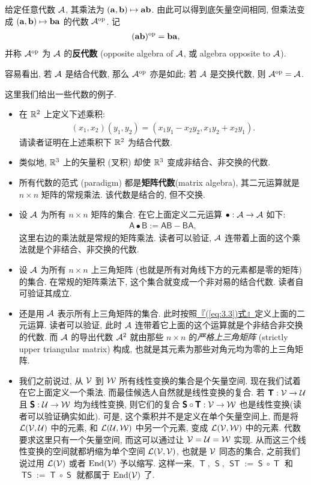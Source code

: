 \documentclass[lang=cn,zihao=-4,twoside,fontset=none]{textbook}
\makeatletter
\DeclareMathOperator{\End}{End}
\newcommand{\bsf}[1]{{\mathop{\pmb{\mathsf{#1}}}}}
\def\EQ#1{\begin{equation}\begin{aligned}{}#1\end{aligned}\end{equation}}
\def\eq#1{\[\begin{aligned}{}#1\end{aligned}\]}
\newcommand{\opp}{{\mathrm{op}}}
\renewcommand{\eqref}[1]{\hyperref[#1]{『\textnormal{(\ref*{#1})}式』}}
\newcommand{\addterm}[2]{\textbf{#1}{(#2)}\index[nidx]{#1@\textbf{#1}(#2)}}
\makeatother
\begin{document}
\begin{defi}
    [反代数]\label{def:3.1.8}%
    给定任意代数 ${\mathcal A}$, 其乘法为 $({\mathbf a},{\mathbf b})\mapsto{\mathbf a}{\mathbf b}$. 由此可以得到底矢量空间相同, 但乘法变成 $({\mathbf a},{\mathbf b})\mapsto{\mathbf b}{\mathbf a}$ 的代数 $\mA^{\opp}$. 记 
    \eq{
        (\bfa\bfb)^{\opp} = \bfb\bfa,
    } 
    并称 $\mA^{\opp}$ 为 ${\mathcal A}$ 的\textbf{反代数} (opposite algebra of ${\mathcal A}$, 或 algebra opposite to ${\mathcal A}$).
\end{defi}

容易看出, 若 ${\mathcal A}$ 是结合代数, 那么 $\mA^\opp$ 亦是如此; 若 ${\mathcal A}$ 是交换代数, 则 $\mA^\opp=\mA$. 

\begin{exam}
    \label{eg:3.1.9}%
    这里我们给出一些代数的例子. 
    \begin{itemize}
        \item 在 ${\mathbb R}^2$ 上定义下述乘积: 
        \eq{
            (x_1,x_2)(y_1,y_2)=(x_1y_1-x_2y_2,x_1y_2+x_2y_1).
        }
        请读者证明在上述乘积下 ${\mathbb R}^2$ 为结合代数. 
        \item 类似地, ${\mathbb R}^3$ 上的矢量积 (叉积) 却使 ${\mathbb R}^3$ 变成非结合、非交换的代数.
        \item 所有代数的范式 (paradigm) 都是\addterm{矩阵代数}{matrix algebra}, 其二元运算就是 $n\times n$ 矩阵的常规乘法. 该代数是结合的, 但不交换. 
        \item 设 ${\mathcal A}$ 为所有 $n\times n$ 矩阵的集合. 在它上面定义二元运算 $\bullet:{\mathcal A}\to{\mathcal A}$ 如下: 
        \EQ{
            \mathsf{A}\bullet\mathsf{B}:= \mathsf{AB}-\mathsf{BA}, \label{eq:3.3}
        }
        这里右边的乘法就是常规的矩阵乘法. 读者可以验证, ${\mathcal A}$ 连带着上面的这个乘法就是个非结合、非交换的代数. 
        \item 设 ${\mathcal A}$ 为所有 $n\times n$ 上三角矩阵 (也就是所有对角线下方的元素都是零的矩阵) 的集合. 在常规的矩阵乘法下, 这个集合就变成一个非对易的结合代数. 读者自可验证其成立. 
        \item 还是用 ${\mathcal A}$ 表示所有上三角矩阵的集合. 此时按照\eqref{eq:3.3}定义上面的二元运算. 读者可以验证, 此时 ${\mathcal A}$ 连带着它上面的这个运算就是个非结合非交换的代数. 而 ${\mathcal A}$ 的导出代数 ${\mathcal A}^2$ 就由那些 $n\times n$ 的\textit{严格上三角矩阵} (strictly upper triangular matrix) 构成, 也就是其元素为那些对角元均为零的上三角矩阵.
        \item 我们之前说过, 从 ${\mathcal V}$ 到 ${\mathcal W}$ 所有线性变换的集合是个矢量空间. 现在我们试着在它上面定义一个乘法. 而最佳候选人自然就是线性变换的复合. 若 $\bsf{T}:\mV\to\mU$ 且 $\bsf{S}:\mU\to\mW$ 均为线性变换, 则它们的复合 $\bsf{S}\circ\bsf{T}:\mV\to\mW$ 也是线性变换(读者可以验证确实如此). 可是, 这个乘积并不是定义在单个矢量空间上, 而是将 ${\mathcal L}({\mathcal V},{\mathcal U})$ 中的元素, 和 ${\mathcal L}({\mathcal U},{\mathcal W})$ 中另一个元素, 变成 ${\mathcal L}({\mathcal V},{\mathcal W})$ 中的元素.  代数要求这里只有一个矢量空间, 而这可以通过让 ${\mathcal V}={\mathcal U}={\mathcal W}$ 实现. 从而这三个线性变换的空间就都坍缩为单个空间 ${\mathcal L}({\mathcal V},{\mathcal V})$, 也就是 ${\mathcal V}$ 同态的集合, 之前我们说过用 ${\mathcal L}({\mathcal V})$ 或者 $\End(\mV)$ 予以缩写. 这样一来, $\bsf{T}$, $\bsf{S}$, $\bsf{ST}:=\bsf{S}\circ\bsf{T}$ 和 $\bsf{TS}:=\bsf{T}\circ\bsf{S}$ 就都属于 $\End(\mV)$ 了. 

\end{itemize}
\end{exam}
\end{document}
